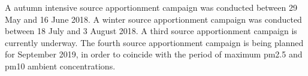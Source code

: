 \documentclass{nwureport}
\begin{document}
A autumn intensive source apportionment campaign was conducted between 29 May and 16 June 2018. A winter source apportionment campaign was conducted between 18 July and 3 August 2018. A third source apportionment campaign is currently underway. The fourth source apportionment campaign is being planned for September 2019, in order to coincide with the period of maximum \gls{pm2.5} and \gls{pm10} ambient concentrations.



\begin{spacing}{0.3}
\linespread{0.8} \normalsize

\end{spacing}
\end{document}
